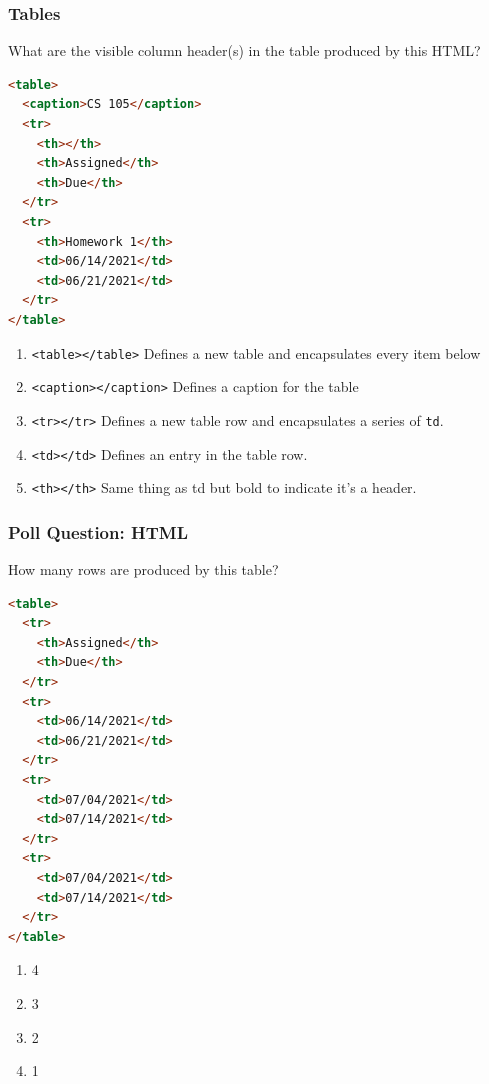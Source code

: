 \documentclass{beamer}
\begin{document}
%
%
\begin{frame}[fragile]
    \frametitle{Tables}
    What are the visible column header(s) in the table produced by this HTML?\\
    \hfill
    \begin{minipage}{0.49\textwidth}
        \begin{lstlisting}[language=html]
<table>
  <caption>CS 105</caption>
  <tr>
    <th></th>
    <th>Assigned</th>
    <th>Due</th>
  </tr>
  <tr>
    <th>Homework 1</th>
    <td>06/14/2021</td>
    <td>06/21/2021</td>
  </tr>
</table>
        \end{lstlisting} 
    \end{minipage}
    \hfill
    \begin{minipage}{0.45\textwidth}
        {\footnotesize
            \begin{enumerate}[A]
                \item \lstinline|<table></table>| \textrightarrow Defines a new table and encapsulates every item below
                \item \lstinline|<caption></caption>| \textrightarrow Defines a caption for the table
                \item \lstinline|<tr></tr>| \textrightarrow Defines a new table row and encapsulates a series of \lstinline|td|.
                \item \lstinline|<td></td>| \textrightarrow Defines an entry in the table row.
                \item \lstinline|<th></th>| \textrightarrow Same thing as td but bold to indicate it's a header.
        \end{enumerate}}
    \end{minipage}
\end{frame}

%
%
\begin{frame}[fragile]
    \frametitle{Poll Question: HTML}
    How many rows are produced by this table?\\
    \begin{minipage}{0.49\textwidth}
        \begin{lstlisting}[language=html, basicstyle=\scriptsize]
<table>
  <tr>
    <th>Assigned</th>
    <th>Due</th>
  </tr>
  <tr>
    <td>06/14/2021</td>
    <td>06/21/2021</td>
  </tr>
  <tr>
    <td>07/04/2021</td>
    <td>07/14/2021</td>
  </tr>
  <tr>
    <td>07/04/2021</td>
    <td>07/14/2021</td>
  </tr>
</table>
        \end{lstlisting} 
    \end{minipage}
    \hfill
    \begin{minipage}{0.39\textwidth}
        \begin{enumerate}[A]
            \item 4
            \item 3
            \item 2
            \item 1
        \end{enumerate}
    \end{minipage}
\end{frame}
\end{document}
